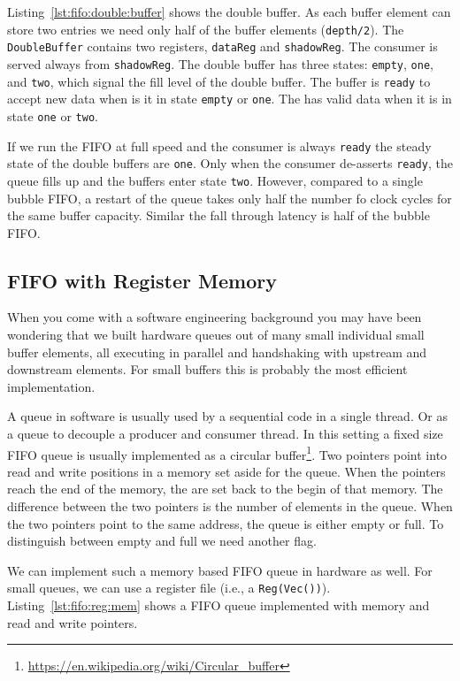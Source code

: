 \documentclass[%
    10pt,
    headinclude, footexclude,
    openright, %
    notitlepage,
    cleardoubleempty,
    headsepline,
    pointlessnumbers,
    bibtotoc, idxtotoc,
    ]{scrbook}
\newcommand{\code}[1]{{\small{\texttt{#1}}}}
\newcommand{\myref}[2]{\href{#1}{#2}}
\renewcommand{\myref}[2]{{#2}{\footnote{\url{#1}}}}
\begin{document}
Listing~\ref{lst:fifo:double:buffer} shows the double buffer. As each buffer element
can store two entries we need only half of the buffer elements (\code{depth/2}).
The \code{DoubleBuffer} contains two registers,
\code{dataReg} and \code{shadowReg}. The consumer is served always from
\code{shadowReg}. The double buffer has three states: \code{empty}, \code{one},
and \code{two}, which signal the fill level of the double buffer.
The buffer is \code{ready} to accept new data when is it in state \code{empty}
or \code{one}. The has valid data when it is in state \code{one} or \code{two}.

If we run the FIFO at full speed and the consumer is always \code{ready}
the steady state of the double buffers are \code{one}. Only when the consumer
de-asserts \code{ready}, the queue fills up and the buffers enter state \code{two}.
However, compared to a single bubble FIFO, a restart of the queue takes
only half the number fo clock cycles for the same buffer capacity.
Similar the fall through latency is half of the bubble FIFO.

\subsection{FIFO with Register Memory}

When you come with a software engineering background you may have been
wondering that we built hardware queues out of many small individual small buffer
elements, all executing in parallel and handshaking with upstream and downstream
elements. For small buffers this is probably the most efficient implementation.

A queue in software is usually used by a sequential code in a single thread.
Or as a queue to decouple a producer and consumer thread.
In this setting a fixed size FIFO queue is usually implemented as a
\myref{https://en.wikipedia.org/wiki/Circular_buffer}{circular buffer}.
Two pointers point into read and write positions in a memory set aside
for the queue. When the pointers reach the end of the memory, the
are set back to the begin of that memory. The difference between the two
pointers is the number of elements in the queue. When the two pointers
point to the same address, the queue is either empty or full.
To distinguish between empty and full we need another flag.

We can implement such a memory based FIFO queue in hardware as
well. For small queues, we can use a register file (i.e., a \code{Reg(Vec())}).
Listing~\ref{lst:fifo:reg:mem} shows a FIFO queue implemented with  memory
and read and write pointers.
\end{document}

